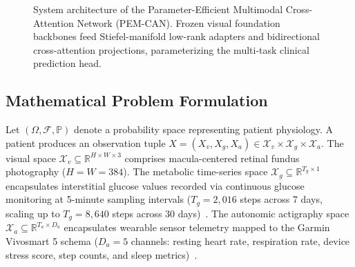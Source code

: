 \documentclass[journal,10pt,twocolumn]{IEEEtran}
\begin{document}
\begin{figure}[!t]
\caption{System architecture of the Parameter-Efficient Multimodal Cross-Attention Network (PEM-CAN). Frozen visual foundation backbones feed Stiefel-manifold low-rank adapters and bidirectional cross-attention projections, parameterizing the multi-task clinical prediction head.}
\label{fig:architecture}
\end{figure}

\subsection{Mathematical Problem Formulation}
Let $(\Omega, \mathcal{F}, \mathbb{P})$ denote a probability space representing patient physiology. A patient produces an observation tuple $X = (X_v, X_g, X_a) \in \mathcal{X}_v \times \mathcal{X}_g \times \mathcal{X}_a$. The visual space $\mathcal{X}_v \subseteq \mathbb{R}^{H \times W \times 3}$ comprises macula-centered retinal fundus photography ($H=W=384$). The metabolic time-series space $\mathcal{X}_g \subseteq \mathbb{R}^{T_g \times 1}$ encapsulates interstitial glucose values recorded via continuous glucose monitoring at 5-minute sampling intervals ($T_g = 2{,}016$ steps across 7 days, scaling up to $T_g = 8{,}640$ steps across 30 days)~\cite{danne2017international,battelino2023continuous}. The autonomic actigraphy space $\mathcal{X}_a \subseteq \mathbb{R}^{T_a \times D_a}$ encapsulates wearable sensor telemetry mapped to the Garmin Vivosmart 5 schema ($D_a = 5$ channels: resting heart rate, respiration rate, device stress score, step counts, and sleep metrics)~\cite{aireadi2024}.
\end{document}
